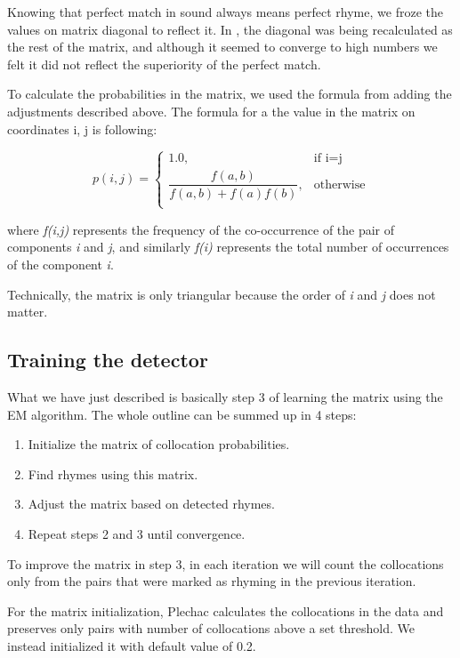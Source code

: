 Knowing that perfect match in sound always means perfect rhyme, we froze the values on matrix diagonal to reflect it. In \cite{plechavc2018collocation}, the diagonal was being recalculated as the rest of the matrix, and although it seemed to converge to high numbers we felt it did not reflect the superiority of the perfect match.

To calculate the probabilities in the matrix, we used the formula from \cite{plechavc2018collocation} adding the adjustments described above. The formula for a the value in the matrix on coordinates i, j is following: 


	    \[ p(i,j) = \begin{cases} 
	    \mbox{1.0,} & \mbox{if  i=j} \\ 
	   \dfrac{f(a,b)}{f(a,b) + f(a)f(b)},
	     & \mbox{otherwise} \\
	    \end{cases} \]

where\textit{ f(i,j)} represents the frequency of the co-occurrence of the pair of components \textit{i} and \textit{j}, and similarly \textit{f(i)} represents the total number of occurrences of the component \textit{i}.

Technically, the matrix is only triangular because the order of \textit{i} and \textit{j} does not matter.

\subsection{Training the detector}
What we have just described is basically step 3 of learning the matrix using the EM algorithm. The whole outline can be summed up in 4 steps:
\begin{enumerate}
	\item Initialize the matrix of collocation probabilities.
	\item Find rhymes using this matrix.
	\item Adjust the matrix based on detected rhymes.
	\item Repeat steps 2 and 3 until convergence.
\end{enumerate} 

To improve the matrix in step 3, in each iteration we will count the collocations only from the pairs that were marked as rhyming in the previous iteration.

For the matrix initialization, Plechac calculates the collocations in the data and preserves only pairs with number of collocations above a set threshold. We instead initialized it with default value of 0.2. 

